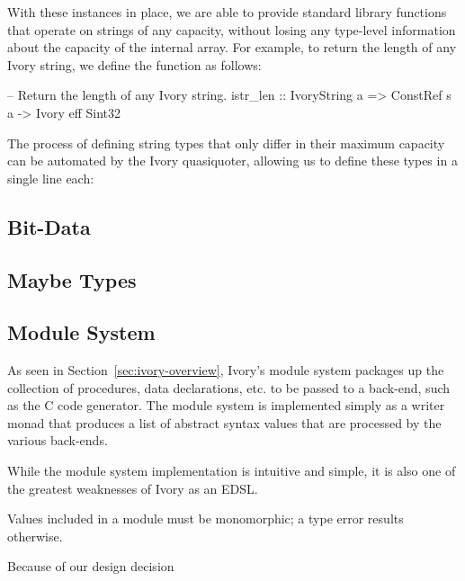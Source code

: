 With these instances in place, we are able to provide standard library
functions that operate on strings of any capacity, without losing any
type-level information about the capacity of the internal array. For
example, to return the length of any Ivory string, we define the
 function as follows:

\begin{code}
-- Return the length of any Ivory string.
istr_len :: IvoryString a
         => ConstRef s a -> Ivory eff Sint32
\end{code}

The process of defining string types that only differ
in their maximum capacity can be automated by the Ivory quasiquoter,
allowing us to define these types in a single line each:

\begin{code}
\end{code}

\subsection{Bit-Data}

\subsection{Maybe Types}

\subsection{Module System}

As seen in Section~\ref{sec:ivory-overview}, Ivory's module system packages up
the collection of procedures, data declarations, etc. to be passed to a
back-end, such as the C code generator. The module system is implemented simply
as a writer monad that produces a list of abstract syntax values that are
processed by the various back-ends.

While the module system implementation is intuitive and simple, it is also one
of the greatest weaknesses of Ivory as an EDSL. 

Values included in a module must be monomorphic; a type error results
otherwise. 

Because of our design decision 







